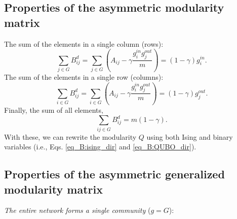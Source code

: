 \documentclass[pdflatex,sn-mathphys-num]{sn-jnl}%
\begin{document}
\subsection{Properties of the asymmetric modularity matrix}
The sum of the elements in a single column (rows):
\begin{equation}\label{eq_B:dir_rows}
    \sum_{j \in G}B_{ij}^d = \sum_{j \in G}\left( A_{ij} - \gamma \frac{g_{i}^{in} g_{j}^{out}}{m}\right) = (1 - \gamma)g_i^{in}.
\end{equation}
The sum of the elements in a single row (columns):
\begin{equation}\label{eq_B:dir_cols}
    \sum_{i \in G}B_{ij}^d = \sum_{i \in G}\left( A_{ij} - \gamma \frac{g_{i}^{in} g_{j}^{out}}{m}\right) = (1 - \gamma)g_j^{out}.
\end{equation}
Finally, the sum of all elements,
\begin{equation} \label{eq_B:dir_elements}
    \sum_{ij \in G}B_{ij}^d = m(1-\gamma).
\end{equation} With these, we can rewrite the modularity $Q$ using both Ising and binary variables (i.e., Eqs. \ref{eq_B:ising_dir} and \ref{eq_B:QUBO_dir}).

\subsection{Properties of the asymmetric generalized modularity matrix}

\textit{The entire network forms a single community }($g=G$):
\end{document}
